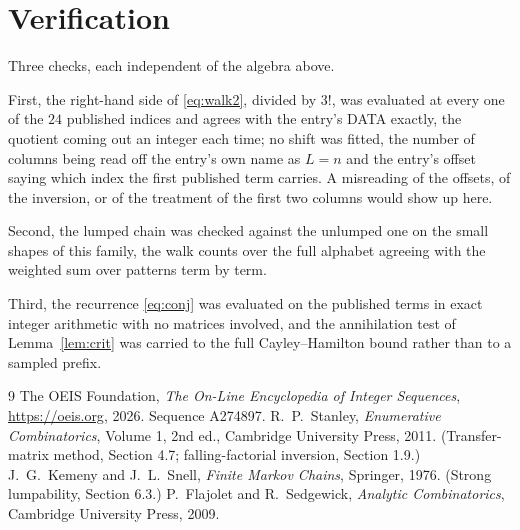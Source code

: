 \documentclass[11pt,a4paper]{article}
\theoremstyle{plain}
\theoremstyle{definition}
\begin{document}
\section{Verification}

Three checks, each independent of the algebra above.

First, the right-hand side of \eqref{eq:walk2}, divided by $3!$, was evaluated at every
one of the $24$ published indices and agrees with the entry's DATA exactly, the quotient
coming out an integer each time; no shift was fitted, the number of columns being read off the
entry's own name as $L=n$ and the entry's offset saying which index the first published
term carries. A misreading of the offsets, of the inversion, or of the treatment of the first
two columns would show up here.

Second, the lumped chain was checked against the unlumped one on the small shapes of this
family, the walk counts over the full alphabet agreeing with the weighted sum over patterns
term by term.

Third, the recurrence \eqref{eq:conj} was evaluated on the published terms in exact integer
arithmetic with no matrices involved, and the annihilation test of Lemma~\ref{lem:crit} was
carried to the full Cayley--Hamilton bound rather than to a sampled prefix.

\begin{thebibliography}{9}
 The OEIS Foundation, \emph{The On-Line Encyclopedia of Integer
Sequences}, \url{https://oeis.org}, 2026. Sequence A274897.
 R.~P.~Stanley, \emph{Enumerative Combinatorics}, Volume 1, 2nd ed.,
Cambridge University Press, 2011. (Transfer-matrix method, Section 4.7; falling-factorial
inversion, Section 1.9.)
 J.~G.~Kemeny and J.~L.~Snell, \emph{Finite Markov Chains}, Springer,
1976. (Strong lumpability, Section 6.3.)
 P.~Flajolet and R.~Sedgewick, \emph{Analytic Combinatorics}, Cambridge
University Press, 2009.
\end{thebibliography}
\end{document}
